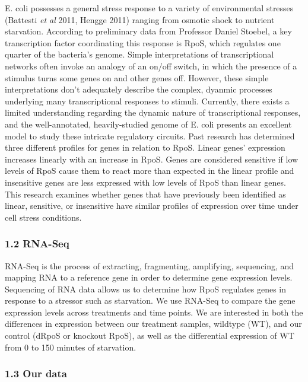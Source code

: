 \documentclass[]{article}
\begin{document}
E. coli possesses a general stress response to a variety of
environmental stresses (Battesti \emph{et al} 2011, Hengge 2011) ranging
from osmotic shock to nutrient starvation. According to preliminary data
from Professor Daniel Stoebel, a key transcription factor coordinating
this response is RpoS, which regulates one quarter of the bacteria's
genome. Simple interpretations of transcriptional networks often invoke
an analogy of an on/off switch, in which the presence of a stimulus
turns some genes on and other genes off. However, these simple
interpretations don't adequately describe the complex, dyanmic processes
underlying many transcriptional responses to stimuli. Currently, there
exists a limited understanding regarding the dynamic nature of
transcriptional responses, and the well-annotated, heavily-studied
genome of E. coli presents an excellent model to study these intricate
regulatory circuits. Past research has determined three different
profiles for genes in relation to RpoS. Linear genes' expression
increases linearly with an increase in RpoS. Genes are considered
sensitive if low levels of RpoS cause them to react more than expected
in the linear profile and insensitive genes are less expressed with low
levels of RpoS than linear genes. This research examines whether genes
that have previously been identified as linear, sensitive, or
insensitive have similar profiles of expression over time under cell
stress conditions.

\subsubsection{\texorpdfstring{\textbf{1.2}
RNA-Seq}{1.2 RNA-Seq}}\label{rna-seq}

RNA-Seq is the process of extracting, fragmenting, amplifying,
sequencing, and mapping RNA to a reference gene in order to determine
gene expression levels. Sequencing of RNA data allows us to determine
how RpoS regulates genes in response to a stressor such as starvation.
We use RNA-Seq to compare the gene expression levels across treatments
and time points. We are interested in both the differences in expression
between our treatment samples, wildtype (WT), and our control (dRpoS or
knockout RpoS), as well as the differential expression of WT from 0 to
150 minutes of starvation.

\subsubsection{\texorpdfstring{\textbf{1.3} Our
data}{1.3 Our data}}\label{our-data}
\end{document}
